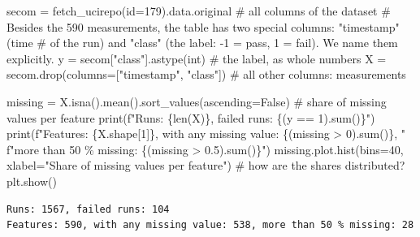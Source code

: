 \documentclass[
  letterpaper,
  DIV=11,
  numbers=noendperiod]{scrreprt}
\newenvironment{Shaded}{\begin{snugshade}}{\end{snugshade}}
\newcommand{\BuiltInTok}[1]{\textcolor[rgb]{0.00,0.23,0.31}{#1}}
\newcommand{\CommentTok}[1]{\textcolor[rgb]{0.37,0.37,0.37}{#1}}
\newcommand{\DecValTok}[1]{\textcolor[rgb]{0.68,0.00,0.00}{#1}}
\newcommand{\FloatTok}[1]{\textcolor[rgb]{0.68,0.00,0.00}{#1}}
\newcommand{\NormalTok}[1]{\textcolor[rgb]{0.00,0.23,0.31}{#1}}
\newcommand{\OperatorTok}[1]{\textcolor[rgb]{0.37,0.37,0.37}{#1}}
\newcommand{\SpecialCharTok}[1]{\textcolor[rgb]{0.37,0.37,0.37}{#1}}
\newcommand{\SpecialStringTok}[1]{\textcolor[rgb]{0.13,0.47,0.30}{#1}}
\newcommand{\StringTok}[1]{\textcolor[rgb]{0.13,0.47,0.30}{#1}}
\newcommand{\VariableTok}[1]{\textcolor[rgb]{0.07,0.07,0.07}{#1}}
\begin{document}
\begin{Shaded}
\begin{Highlighting}[]
\NormalTok{secom }\OperatorTok{=}\NormalTok{ fetch\_ucirepo(}\BuiltInTok{id}\OperatorTok{=}\DecValTok{179}\NormalTok{).data.original          }\CommentTok{\# all columns of the dataset}
\CommentTok{\# Besides the 590 measurements, the table has two special columns: "timestamp" (time}
\CommentTok{\# of the run) and "class" (the label: {-}1 = pass, 1 = fail). We name them explicitly.}
\NormalTok{y }\OperatorTok{=}\NormalTok{ secom[}\StringTok{"class"}\NormalTok{].astype(}\BuiltInTok{int}\NormalTok{)                       }\CommentTok{\# the label, as whole numbers}
\NormalTok{X }\OperatorTok{=}\NormalTok{ secom.drop(columns}\OperatorTok{=}\NormalTok{[}\StringTok{"timestamp"}\NormalTok{, }\StringTok{"class"}\NormalTok{])       }\CommentTok{\# all other columns: measurements}

\NormalTok{missing }\OperatorTok{=}\NormalTok{ X.isna().mean().sort\_values(ascending}\OperatorTok{=}\VariableTok{False}\NormalTok{)   }\CommentTok{\# share of missing values per feature}
\BuiltInTok{print}\NormalTok{(}\SpecialStringTok{f"Runs: }\SpecialCharTok{\{}\BuiltInTok{len}\NormalTok{(X)}\SpecialCharTok{\}}\SpecialStringTok{, failed runs: }\SpecialCharTok{\{}\NormalTok{(y }\OperatorTok{==} \DecValTok{1}\NormalTok{)}\SpecialCharTok{.}\BuiltInTok{sum}\NormalTok{()}\SpecialCharTok{\}}\SpecialStringTok{"}\NormalTok{)}
\BuiltInTok{print}\NormalTok{(}\SpecialStringTok{f"Features: }\SpecialCharTok{\{}\NormalTok{X}\SpecialCharTok{.}\NormalTok{shape[}\DecValTok{1}\NormalTok{]}\SpecialCharTok{\}}\SpecialStringTok{, with any missing value: }\SpecialCharTok{\{}\NormalTok{(missing }\OperatorTok{\textgreater{}} \DecValTok{0}\NormalTok{)}\SpecialCharTok{.}\BuiltInTok{sum}\NormalTok{()}\SpecialCharTok{\}}\SpecialStringTok{, "}
      \SpecialStringTok{f"more than 50 \% missing: }\SpecialCharTok{\{}\NormalTok{(missing }\OperatorTok{\textgreater{}} \FloatTok{0.5}\NormalTok{)}\SpecialCharTok{.}\BuiltInTok{sum}\NormalTok{()}\SpecialCharTok{\}}\SpecialStringTok{"}\NormalTok{)}
\NormalTok{missing.plot.hist(bins}\OperatorTok{=}\DecValTok{40}\NormalTok{, xlabel}\OperatorTok{=}\StringTok{"Share of missing values per feature"}\NormalTok{)   }\CommentTok{\# how are the shares distributed?}
\NormalTok{plt.show()}
\end{Highlighting}
\end{Shaded}

\begin{verbatim}
Runs: 1567, failed runs: 104
Features: 590, with any missing value: 538, more than 50 % missing: 28
\end{verbatim}
\end{document}

